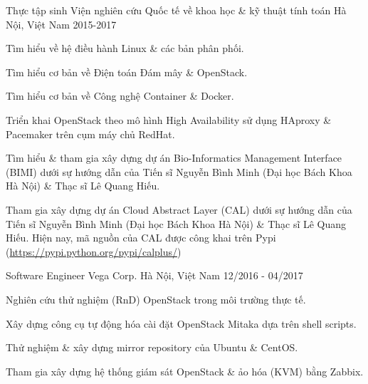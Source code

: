 

\begin{cventries}

  \cventry
    {Thực tập sinh} %
    {Viện nghiên cứu Quốc tế về khoa học \& kỹ thuật tính toán} %
    {Hà Nội, Việt Nam} %
    {2015-2017} %
    {
      \begin{cvitems} %
        \item {Tìm hiểu về hệ điều hành Linux \& các bản phân phối.}
        \item {Tìm hiểu cơ bản về Điện toán Đám mây \& OpenStack.}
        \item {Tìm hiểu cơ bản về Công nghệ Container \& Docker.}
        \item {Triển khai OpenStack theo mô hình High Availability sử dụng HAproxy \& Pacemaker trên cụm máy chủ RedHat.}
        \item {Tìm hiểu \& tham gia xây dựng dự án Bio-Informatics Management Interface (BIMI) dưới sự hướng dẫn của Tiến sĩ Nguyễn Bình Minh (Đại học Bách Khoa Hà Nội) \& Thạc sĩ Lê Quang Hiếu.}
        \item {Tham gia xây dựng dự án Cloud Abstract Layer (CAL) dưới sự hướng dẫn của Tiến sĩ Nguyễn Bình Minh (Đại học Bách Khoa Hà Nội) \& Thạc sĩ Lê Quang Hiếu. Hiện nay, mã nguồn của CAL được công khai trên Pypi (\url{https://pypi.python.org/pypi/calplus/})}
      \end{cvitems}
    }

  \cventry
    {Software Engineer} %
    {Vega Corp.} %
    {Hà Nội, Việt Nam} %
    {12/2016 - 04/2017} %
    {
      \begin{cvitems} %
        \item {Nghiên cứu thử nghiệm (RnD) OpenStack trong môi trường thực tế.}
        \item {Xây dựng công cụ tự động hóa cài đặt OpenStack Mitaka dựa trên shell scripts.}
        \item {Thử nghiệm \& xây dựng mirror repository của Ubuntu \& CentOS.}
        \item {Tham gia xây dựng hệ thống giám sát OpenStack \& ảo hóa (KVM) bằng Zabbix.}
      \end{cvitems}
    }


\end{cventries}
